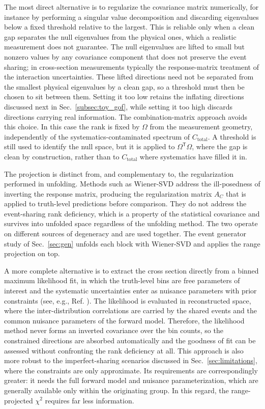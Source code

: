 \documentclass[a4paper,11pt]{article}
\begin{document}
The most direct alternative is to regularize the covariance matrix numerically, for instance by performing a singular value decomposition and discarding eigenvalues below a fixed threshold relative to the largest. This is reliable only when a clean gap separates the null eigenvalues from the physical ones, which a realistic measurement does not guarantee. The null eigenvalues are lifted to small but nonzero values by any covariance component that does not preserve the event sharing; in cross-section measurements typically the response-matrix treatment of the interaction uncertainties. These lifted directions need not be separated from the smallest physical eigenvalues by a clean gap, so a threshold must then be chosen to sit between them. Setting it too low retains the inflating directions discussed next in Sec.~\ref{subsec:toy_gof}, while setting it too high discards directions carrying real information. The combination-matrix approach avoids this choice. In this case the rank is fixed by $\Omega$ from the measurement geometry, independently of the systematics-contaminated spectrum of $C_{\text{total}}$. A threshold is still used to identify the null space, but it is applied to $\Omega^{\mathsf{T}}\Omega$, where the gap is clean by construction, rather than to $C_{\text{total}}$ where systematics have filled it in.

The projection is distinct from, and complementary to, the regularization performed in unfolding. Methods such as Wiener-SVD \cite{Tang:2017rob} address the ill-posedness of inverting the response matrix, producing the regularization matrix $A_C$ that is applied to truth-level predictions before comparison. They do not address the event-sharing rank deficiency, which is a property of the statistical covariance and survives into unfolded space regardless of the unfolding method. The two operate on different sources of degeneracy and are used together. The event generator study of Sec.~\ref{sec:gen} unfolds each block with Wiener-SVD and applies the range projection on top.

A more complete alternative is to extract the cross section directly from a binned maximum likelihood fit, in which the truth-level bins are free parameters of interest and the systematic uncertainties enter as nuisance parameters with prior constraints (see, e.g., Ref. \cite{T2K:2023qjb}). The likelihood is evaluated in reconstructed space, where the inter-distribution correlations are carried by the shared events and the common nuisance parameters of the forward model. Therefore, the likelihood method never forms an inverted covariance over the bin counts, so the constrained directions are absorbed automatically and the goodness of fit can be assessed without confronting the rank deficiency at all. This approach is also more robust to the imperfect-sharing scenarios discussed in Sec.~\ref{sec:limitations}, where the constraints are only approximate. Its requirements are correspondingly greater: it needs the full forward model and nuisance parameterization, which are generally available only within the originating group. In this regard, the range-projected $\chi^2$ requires far less information.
\end{document}

